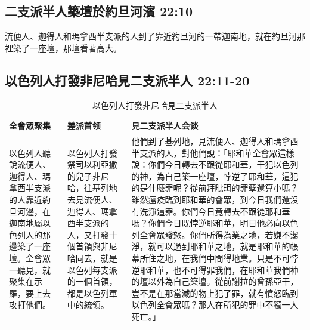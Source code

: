 \subsection{二支派半人築壇於約旦河濱 22:10}

流便人、迦得人和瑪拿西半支派的人到了靠近約旦河的一帶迦南地，就在約旦河那裡築了一座壇，那壇看著高大。 

\subsection{以色列人打發非尼哈見二支派半人 22:11-20}
\begin{table}[H]
\centering
\begin{tabular}{p{2.5cm}|p{2.95cm}|p{11.5cm}}\hline\hline
全會眾聚集&差派首领&見二支派半人会谈\\\hline
以色列人聽說流便人、迦得人、瑪拿西半支派的人靠近約旦河邊，在迦南地屬以色列人的那邊築了一座壇。全會眾一聽見，就聚集在示羅，要上去攻打他們。
&以色列人打發祭司以利亞撒的兒子非尼哈，往基列地去見流便人、迦得人、瑪拿西半支派的人，又打發十個首領與非尼哈同去，就是以色列每支派的一個首領，都是以色列軍中的統領。
&他們到了基列地，見流便人、迦得人和瑪拿西半支派的人，對他們說：「耶和華全會眾這樣說：你們今日轉去不跟從耶和華，干犯以色列的神，為自己築一座壇，悖逆了耶和華，這犯的是什麼罪呢？從前拜毗珥的罪孽還算小嗎？雖然瘟疫臨到耶和華的會眾，到今日我們還沒有洗淨這罪。你們今日竟轉去不跟從耶和華嗎？你們今日既悖逆耶和華，明日他必向以色列全會眾發怒。你們所得為業之地，若嫌不潔淨，就可以過到耶和華之地，就是耶和華的帳幕所住之地，在我們中間得地業。只是不可悖逆耶和華，也不可得罪我們，在耶和華我們神的壇以外為自己築壇。從前謝拉的曾孫亞干，豈不是在那當滅的物上犯了罪，就有憤怒臨到以色列全會眾嗎？那人在所犯的罪中不獨一人死亡。」\\\hline
 \end{tabular}
\caption{以色列人打發非尼哈見二支派半人}
\end{table}





